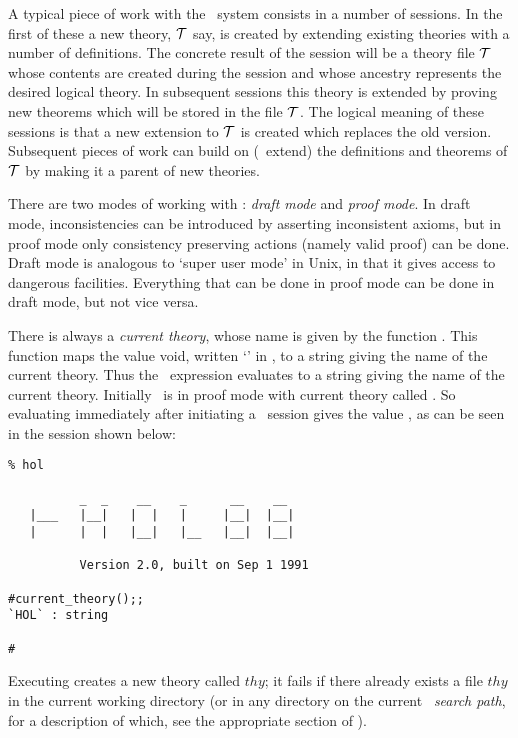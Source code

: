 A typical piece of work with the \HOL\ system consists in a number of sessions. In
the first of these a new theory, ${\cal T}$ say, is created by extending existing
theories with a number of definitions. The concrete result of the session will be a
theory file ${\cal T}$ whose contents are created during the
session and whose ancestry represents the desired logical theory.  In subsequent
sessions this theory is extended by proving new theorems which will be stored in
the file ${\cal T}$. The logical meaning of these sessions is that a new
extension to ${\cal T}$ is created which replaces the old version.  Subsequent
pieces of work can build on (\ie\ extend) the definitions and theorems of ${\cal
T}$ by making it a parent of new theories.

There are two modes of working with \HOL:   {\it  draft mode\/}  and {\it proof
mode\/}.  In  draft  mode,  inconsistencies  can  be  introduced  by  asserting
inconsistent axioms,  but  in  proof  mode only  consistency preserving actions
(namely valid proof) can be done.  Draft mode is analogous to `super user mode'
in Unix, in that it gives access to dangerous facilities.   Everything that can
be done in proof mode can be done in draft mode, but not vice versa.

There is always a {\it current theory\/}, whose name  is given  by the function
.  This function maps the value void, written
`\ml{()}' in \ML, to a string giving the name of the current theory.
Thus the \ML\ expression
 evaluates to a string giving the name of the current
theory.  Initially  \HOL\  is in  proof mode  with current theory
called .  So evaluating  immediately after
initiating a \HOL\ session gives the value , as can be seen in
the session shown below:


\setcounter{sessioncount}{1}
\begin{session}\begin{verbatim}
% hol

          _  _    __    _      __    __
   |___   |__|   |  |   |     |__|  |__|
   |      |  |   |__|   |__   |__|  |__|

          Version 2.0, built on Sep 1 1991

#current_theory();;
`HOL` : string

#
\end{verbatim}\end{session}

Executing  creates a new  theory called  $thy$; it fails
if there already exists a file $thy$ in the current working
directory (or in any directory on the current \HOL\ {\it search path\/},
for a description of  which, see  the appropriate  section of
\DESCRIPTION).

